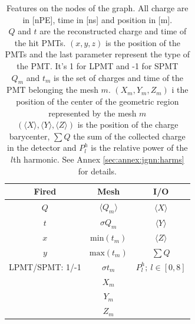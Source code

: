 \documentclass[../main.tex]{subfiles}
\begin{document}
\begin{table}[ht]
  \centering
  \begin{tabular}{|c|c|c|}
    \hline
    Fired & Mesh & I/O \\
    \hline \hline
    $Q$ & $\langle Q_m \rangle$ & $\langle X \rangle$ \\
    $t$ & $\sigma Q_m$ & $\langle Y \rangle$ \\
    $x$ & $\mathrm{min}(t_m)$ & $\langle Z \rangle$ \\
    $y$ & $\mathrm{max}(t_m)$ & $\sum Q$ \\
    LPMT/SPMT: 1/-1 & $\sigma t_m$ & $P^h_l; ~ l \in [0,8]$ \\
            & $X_m$ & \\
             & $Y_m$ & \\
             & $Z_m$ & \\
    \hline
  \end{tabular}
  \caption{Features on the nodes of the graph. All charge are in [nPE], time in [ns] and position in [m]. \\
  $Q$ and $t$ are the reconstructed charge and time of the hit PMTs. $(x,y,z)$ is the position of the PMTs and the last parameter represent the type of the PMT. It's 1 for LPMT and -1 for SPMT \\
  $Q_m$ and $t_m$ is the set of charges and time of the PMT belonging the mesh $m$. $(X_m, Y_m, Z_m)$ i the position of the center of the geometric region represented by the mesh $m$ \\
  $(\langle X \rangle, \langle Y \rangle, \langle Z \rangle)$ is the position of the charge barycenter, $\sum Q$ the sum of the collected charge in the detector and $P^h_l$ is the relative power of the $l$th harmonic. See Annex \ref{sec:annex:jgnn:harms} for details.}
  \label{tab:jgnn:node_feat}
\end{table}
\end{document}
